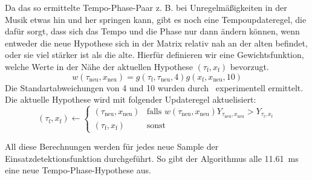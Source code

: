 {{{			%
			Da das so ermittelte Tempo-Phase-Paar  z. B. bei Unregelmäßigkeiten in der Musik etwas hin und her springen kann,
				gibt es noch eine Tempoupdateregel,
				die dafür sorgt,
				dass sich das Tempo und die Phase nur dann ändern können,
				wenn entweder die neue Hypothese sich in der Matrix relativ nah an der alten befindet,
				oder sie viel stärker ist als die alte.
			Hierfür definieren wir eine Gewichtsfunktion,
				welche Werte in der Nähe der aktuellen Hypothese $(\tau_\text{f}, x_\text{f})$ bevorzugt.
			\begin{equation}
				w(\tau_{\text{neu}}, x_{\text{neu}}) =
					g(\tau_\text{f}, \tau_{\text{neu}}, 4)
					g(x_\text{f}, x_{\text{neu}}, 10)
			\end{equation}
			Die Standartabweichungen von \num{4} und \num{10} wurden durch~\cite{2011_PlRoSt} experimentell ermittelt.
			Die aktuelle Hypothese wird mit folgender Updateregel aktuelisiert:
			\begin{equation}
				(\tau_\text{f}, x_\text{f}) \leftarrow
				\begin{cases}
					(\tau_{\text{neu}}, x_{\text{neu}}) &
						\text{falls } w(\tau_{\text{neu}}, x_{\text{neu}}) Y_{\tau_{\text{neu}}, x_{\text{neu}}} >
							Y_{\tau_\text{f}, x_\text{f}} \\
					(\tau_\text{f}, x_\text{f}) &
						\text{sonst}
				\end{cases}
			\end{equation}

			All diese Berechnungen werden für jedes neue Sample der Einsatzdetektionsfunktion durchgeführt.
			So gibt der Algorithmus alle \SI{11.61}{\milli\second} eine neue Tempo-Phase-Hypothese aus.
		}
	}
}

